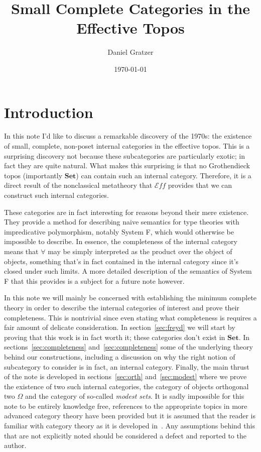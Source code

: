 \documentclass[12pt]{amsart}
\title{Small Complete Categories in the Effective Topos}
\author{Daniel Gratzer}
\date{\today}
\newcommand{\cat}[1]{\ensuremath{\mathbf{#1}}}
\newcommand{\set}{\cat{Set}}
\newcommand{\eff}{\mathcal{E}\!f\!f}
\begin{document}
\maketitle

\section{Introduction}\label{sec:introduction}

In this note I'd like to discuss a remarkable discovery of the 1970s:
the existence of small, complete, non-poset internal categories in the
effective topos. This is a surprising discovery not because these
subcategories are particularly exotic; in fact they are quite
natural. What makes this surprising is that no Grothendieck topos
(importantly $\set$) can contain such an internal category. Therefore,
it is a direct result of the nonclassical metatheory that $\eff$
provides that we can construct such internal categories.

These categories are in fact interesting for reasons beyond their mere
existence. They provide a method for describing naive semantics for
type theories with impredicative polymorphism, notably System F, which
would otherwise be impossible to describe. In essence, the
completeness of the internal category means that $\forall$ may be
simply interpreted as the product over the object of objects,
something that's in fact contained in the internal category since it's
closed under such limits. A more detailed description of the semantics
of System F that this provides is a subject for a future note however.

In this note we will mainly be concerned with establishing the minimum
complete theory in order to describe the internal categories of
interest and prove their completeness. This is nontrivial since even
stating what completeness is requires a fair amount of delicate
consideration. In section~\ref{sec:freyd} we will start by proving
that this work is in fact worth it; these categories don't exist in
$\set$. In sections~\ref{sec:completeness} and~\ref{sec:completeness}
some of the underlying theory behind our constructions, including a
discussion on why the right notion of subcategory to consider is in
fact, an internal category. Finally, the main thrust of the note is
developed in sections~\ref{sec:orth} and~\ref{sec:modest} where we
prove the existence of two such internal categories, the category of
objects orthogonal two $\Omega$ and the category of so-called
\emph{modest sets}. It is sadly impossible for this note to be
entirely knowledge free, references to the appropriate topics in more
advanced category theory have been provided but it is assumed that the
reader is familiar with category theory as it is developed
in~\citet{MacLane:98}. Any assumptions behind this that are not
explicitly noted should be considered a defect and reported to the
author.
\end{document}
